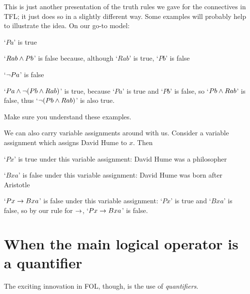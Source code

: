 This is just another presentation of the truth rules we gave for the connectives in TFL; it just does so in a slightly different way. Some examples will probably help to illustrate the idea. On our go-to model:
	\begin{earg}
		\item[\textbullet] `$Pa$' is true
		\item[\textbullet] `$Rab \mathbin{\wedge} Pb$' is false because, although `$Rab$' is true, `$Pb$' is false
		\item[\textbullet] `$\neg Pa$' is false
		\item[\textbullet] `$Pa \mathbin{\wedge} \neg(Pb\mathbin{\wedge} Rab)$' is true, because `$Pa$' is true and `$Pb$' is false, so `$Pb\mathbin{\wedge} Rab$' is false, thus `$\neg (Pb\mathbin{\wedge} Rab)$' is also true.
	\end{earg}
Make sure you understand these examples.

We can also carry variable assignments around with us. Consider a variable assignment which assigns David Hume to $x$. Then \begin{ebullet}
\item `$Px$' is true under this variable assignment: David Hume was a philosopher
\item `$Bxa$' is false under this variable assignment: David Hume was born after Aristotle
\item `$Px\rightarrow Bxa$' is false under this variable assignment: `$Px$' is true and `$Bxa$' is false, so by our rule for $\rightarrow$, `$Px\rightarrow Bxa$' is false.
\end{ebullet}


\section{When the main logical operator is a quantifier}
The exciting innovation in FOL, though, is the use of \emph{quantifiers}.

